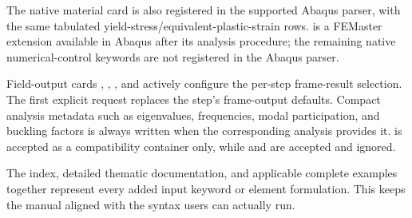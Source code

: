 The native  material card is also registered in the supported Abaqus parser, with the same tabulated yield-stress/equivalent-plastic-strain rows.  is a FEMaster extension available in Abaqus  after its analysis procedure; the remaining native numerical-control keywords are not registered in the Abaqus parser.

Field-output cards , , , and  actively configure the per-step frame-result selection. The first explicit request replaces the step's frame-output defaults. Compact analysis metadata such as eigenvalues, frequencies, modal participation, and buckling factors is always written when the corresponding analysis provides it.  is accepted as a compatibility container only, while  and  are accepted and ignored.

The index, detailed thematic documentation, and applicable complete examples together represent every added input keyword or element formulation. This keeps the manual aligned with the syntax users can actually run.

